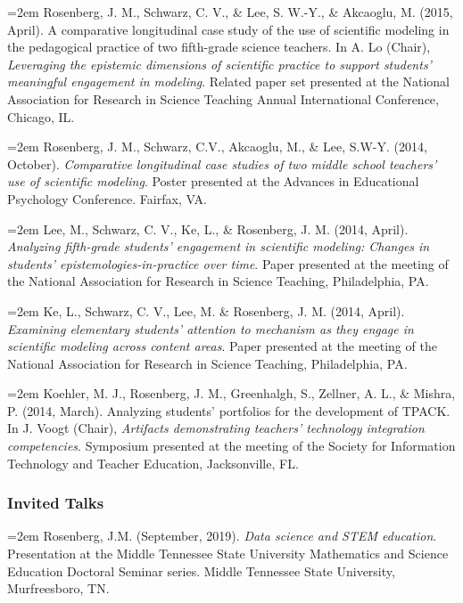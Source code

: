 \documentclass[14,]{article}
\begin{document}
\hangindent=2em Rosenberg, J. M., Schwarz, C. V., \& Lee, S. W.-Y., \&
Akcaoglu, M. (2015, April). A comparative longitudinal case study of the
use of scientific modeling in the pedagogical practice of two
fifth-grade science teachers. In A. Lo (Chair), \emph{Leveraging the
epistemic dimensions of scientific practice to support students'
meaningful engagement in modeling}. Related paper set presented at the
National Association for Research in Science Teaching Annual
International Conference, Chicago, IL.

\hangindent=2em Rosenberg, J. M., Schwarz, C.V., Akcaoglu, M., \& Lee,
S.W-Y. (2014, October). \emph{Comparative longitudinal case studies of
two middle school teachers' use of scientific modeling}. Poster
presented at the Advances in Educational Psychology Conference. Fairfax,
VA.

\hangindent=2em Lee, M., Schwarz, C. V., Ke, L., \& Rosenberg, J. M.
(2014, April). \emph{Analyzing fifth-grade students' engagement in
scientific modeling: Changes in students' epistemologies-in-practice
over time}. Paper presented at the meeting of the National Association
for Research in Science Teaching, Philadelphia, PA.

\hangindent=2em Ke, L., Schwarz, C. V., Lee, M. \& Rosenberg, J. M.
(2014, April). \emph{Examining elementary students' attention to
mechanism as they engage in scientific modeling across content areas}.
Paper presented at the meeting of the National Association for Research
in Science Teaching, Philadelphia, PA.

\hangindent=2em Koehler, M. J., Rosenberg, J. M., Greenhalgh, S.,
Zellner, A. L., \& Mishra, P. (2014, March). Analyzing students'
portfolios for the development of TPACK. In J. Voogt (Chair),
\emph{Artifacts demonstrating teachers' technology integration
competencies}. Symposium presented at the meeting of the Society for
Information Technology and Teacher Education, Jacksonville, FL.

\hypertarget{invited-talks}{%
\subsubsection{Invited Talks}\label{invited-talks}}

\hangindent=2em Rosenberg, J.M. (September, 2019). \emph{Data science
and STEM education}. Presentation at the Middle Tennessee State
University Mathematics and Science Education Doctoral Seminar series.
Middle Tennessee State University, Murfreesboro, TN.
\end{document}
